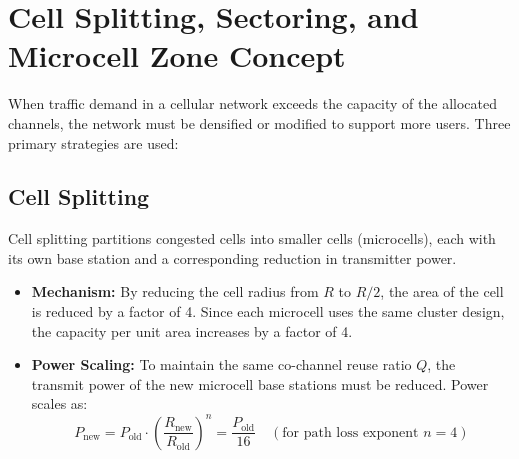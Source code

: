 \documentclass[12pt,a4paper]{article}
\begin{document}
\section{Cell Splitting, Sectoring, and Microcell Zone Concept}

When traffic demand in a cellular network exceeds the capacity of the allocated channels, the network must be densified or modified to support more users. Three primary strategies are used:

\subsection{Cell Splitting}
Cell splitting partitions congested cells into smaller cells (microcells), each with its own base station and a corresponding reduction in transmitter power.
\begin{itemize}[leftmargin=*, itemsep=3pt]
  \item \textbf{Mechanism:} By reducing the cell radius from $R$ to $R/2$, the area of the cell is reduced by a factor of 4. Since each microcell uses the same cluster design, the capacity per unit area increases by a factor of 4.
  \item \textbf{Power Scaling:} To maintain the same co-channel reuse ratio $Q$, the transmit power of the new microcell base stations must be reduced. Power scales as:
    \begin{equation}
      P_{\text{new}} = P_{\text{old}} \cdot \left(\frac{R_{\text{new}}}{R_{\text{old}}}\right)^n = \frac{P_{\text{old}}}{16} \quad (\text{for path loss exponent } n=4)
    \end{equation}
\end{itemize}

\begin{tcolorbox}[tikzbox, title={Cell Splitting Concept (Radius R divided by 2)}]
\centering
{}
\end{tcolorbox}
\end{document}
